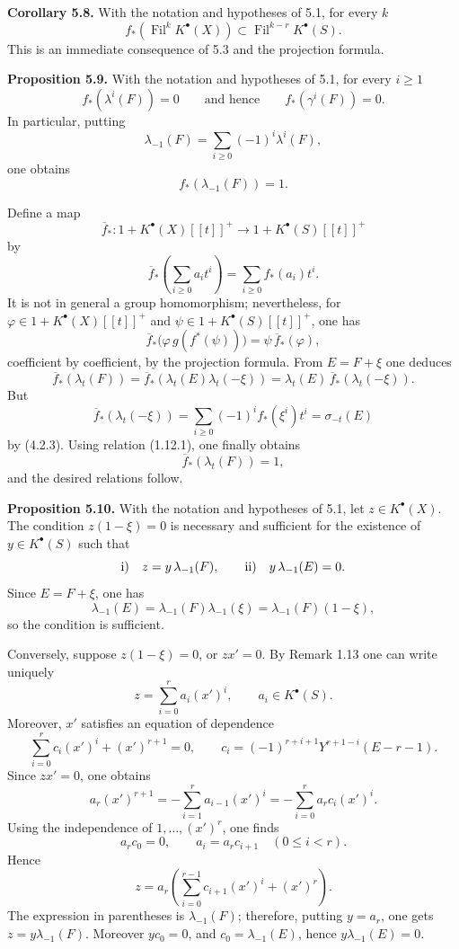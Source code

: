 \documentclass[11pt]{article}
\newcommand{\Fil}{\operatorname{Fil}}
\begin{document}
\textbf{Corollary 5.8.} With the notation and hypotheses of 5.1, for every \(k\)
\[
  f_*(\Fil^kK^\bullet(X))\subset \Fil^{k-r}K^\bullet(S).
\]
This is an immediate consequence of 5.3 and the projection formula.

\textbf{Proposition 5.9.} With the notation and hypotheses of 5.1, for every \(i\geq1\)
\[
  f_*(\lambda^i(F))=0
  \qquad\text{and hence}\qquad
  f_*(\gamma^i(F))=0.
\]
In particular, putting
\[
  \lambda_{-1}(F)=\sum_{i\geq0}(-1)^i\lambda^i(F),
\]
one obtains
\[
  f_*(\lambda_{-1}(F))=1.
\]

Define a map
\[
  \overline f_*:1+K^\bullet(X)[[t]]^+
       \longrightarrow 1+K^\bullet(S)[[t]]^+
\]
by
\[
  \overline f_*\left(\sum_{i\geq0}a_i t^i\right)
  =
  \sum_{i\geq0}f_*(a_i)t^i.
\]
It is not in general a group homomorphism; nevertheless, for
\(\varphi\in 1+K^\bullet(X)[[t]]^+\) and
\(\psi\in 1+K^\bullet(S)[[t]]^+\), one has
\[
  \overline f_*\bigl(\varphi\, g(f^*(\psi))\bigr)
  =
  \psi\,\overline f_*(\varphi),
\]
coefficient by coefficient, by the projection formula. From \(E=F+\xi\) one deduces
\[
  \overline f_*(\lambda_t(F))
  =
  \overline f_*(\lambda_t(E)\lambda_t(-\xi))
  =
  \lambda_t(E)\,\overline f_*(\lambda_t(-\xi)).
\]
But
\[
  \overline f_*(\lambda_t(-\xi))
  =
  \sum_{i\geq0}(-1)^i f_*(\xi^i)t^i
  =
  \sigma_{-t}(E)
\]
by (4.2.3). Using relation (1.12.1), one finally obtains
\[
  \overline f_*(\lambda_t(F))=1,
\]
and the desired relations follow.

\textbf{Proposition 5.10.} With the notation and hypotheses of 5.1, let \(z\in K^\bullet(X)\). The condition \(z(1-\xi)=0\) is necessary and sufficient for the existence of \(y\in K^\bullet(S)\) such that
\[
  \text{\rm i)}\quad z=y\,\lambda_{-1}(F),
  \qquad
  \text{\rm ii)}\quad y\,\lambda_{-1}(E)=0.
\]
Since \(E=F+\xi\), one has
\[
  \lambda_{-1}(E)=\lambda_{-1}(F)\lambda_{-1}(\xi)
  =\lambda_{-1}(F)(1-\xi),
\]
so the condition is sufficient.

Conversely, suppose \(z(1-\xi)=0\), or \(zx'=0\). By Remark 1.13 one can write uniquely
\[
  z=\sum_{i=0}^{r}a_i(x')^i,\qquad a_i\in K^\bullet(S).
\]
Moreover, \(x'\) satisfies an equation of dependence
\[
  \sum_{i=0}^{r}c_i(x')^i+(x')^{r+1}=0,
\qquad
  c_i=(-1)^{r+i+1}Y^{r+1-i}(E-r-1).
\]
Since \(zx'=0\), one obtains
\[
  a_r(x')^{r+1}
  =
  -\sum_{i=1}^{r}a_{i-1}(x')^i
  =
  -\sum_{i=0}^{r}a_rc_i(x')^i.
\]
Using the independence of \(1,\ldots,(x')^r\), one finds
\[
  a_rc_0=0,\qquad a_i=a_rc_{i+1}\quad(0\leq i<r).
\]
Hence
\[
  z=a_r\left(\sum_{i=0}^{r-1}c_{i+1}(x')^i+(x')^r\right).
\]
The expression in parentheses is \(\lambda_{-1}(F)\); therefore, putting \(y=a_r\), one gets \(z=y\lambda_{-1}(F)\). Moreover \(yc_0=0\), and \(c_0=\lambda_{-1}(E)\), hence \(y\lambda_{-1}(E)=0\).
\end{document}

